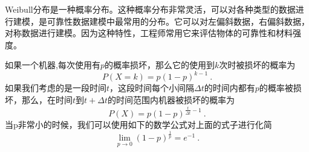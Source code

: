 
Weibull分布是一种概率分布。这种概率分布非常灵活，可以对各种类型的数据进行建模，是可靠性数据建模中最常用的分布。它可以对左偏斜数据，右偏斜数据，对称数据进行建模。因为这种特性，工程师常用它来评估物体的可靠性和材料强度。

如果一个机器,每次使用有$p$的概率损坏，那么它的使用到$k$次时被损坏的概率为
\begin{equation}
P(X=k)=p(1-p)^{k-1}~.
\end{equation}
如果我们考虑的是一段时间$t$，这段时间每个小间隔$\Delta t$的时间内都有$p$的概率被损坏，那么，在时间$t$到$t+\Delta t$的时间范围内机器被损坏的概率为
\begin{equation}
P(X)=p(1-p)^{\frac{t}{\Delta t}-1}~.
\end{equation}
当p非常小的时候，我们可以使用如下的数学公式对上面的式子进行化简
\begin{equation}
\lim _{p \rightarrow 0}(1-p)^{\frac{1}{p}}=e^{-1}~.
\end{equation}